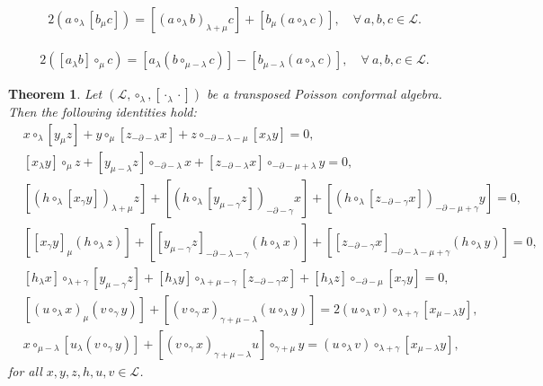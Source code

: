 \documentclass[10pt,a4paper]{amsart}
\newtheorem{theorem}{Theorem}
\begin{document}
   \begin{align}\label{rule3}
      2 (a\circ_{\lambda}[b_{\mu}c])=[(a\circ_{\lambda}b)_{\lambda+\mu}c]+[b_{\mu}(a\circ_{\lambda}c)],\quad\forall~ a,b,c\in \mathcal{L}.	
   \end{align}%

	\begin{align}\label{rule5}
		2([a_{\lambda}b]\circ_{\mu}c)=[a_{{\lambda}}(b\circ_{\mu-\lambda}c)]-[b_{\mu-\lambda}(a\circ_{\lambda}c)],\quad\forall~ a,b,c\in \mathcal{L}.
	\end{align}

\begin{theorem}
   Let $(\mathcal{L} ,\circ_\lambda,[{\cdot_ \lambda \cdot}])$ be a transposed Poisson conformal algebra. Then the following identities hold:
   \begin{align}
      &x\circ_{\lambda}[y_{\mu}z]+y\circ_{\mu}[z_{-\partial-\lambda}x]+z\circ_{-\partial-\lambda-\mu}[x_{\lambda}y]=0, \label{eqh}\\
      &[x_{\lambda}y]\circ_{\mu}z+[y_{\mu-\lambda}z]\circ_{-\partial-\lambda}x+[z_{-\partial-\lambda}x]\circ_{-\partial-\mu+\lambda}y=0, \label{eqw}\\
      &[(h\circ_{\lambda}[x_{\gamma}y])_{\lambda+\mu}z]+[(h\circ_{\lambda}[y_{\mu-\gamma}z])_{-\partial-\gamma}x]+[(h\circ_{\lambda}[z_{-\partial-\gamma}x])_{-\partial-\mu+\gamma}y]=0, \label{eqs}\\
      &[[x_{\gamma}y]_{\mu}(h\circ_{\lambda}z)]+[[y_{\mu-\gamma}z]_{-\partial-\lambda-\gamma}(h\circ_{\lambda}x)]+[[z_{-\partial-\gamma}x]_{-\partial-\lambda-\mu+\gamma}(h\circ_{\lambda}y)]=0, \label{equ}\\
      &[h_{\lambda}x]\circ_{\lambda+\gamma}[y_{\mu-\gamma}z]+[h_{\lambda}y]\circ_{\lambda+\mu-\gamma}[z_{-\partial-\gamma}x]+[h_{\lambda}z]\circ_{-\partial-\mu}[x_{\gamma}y]=0,  \label{eql}\\
      &[(u\circ_{\lambda}x)_{\mu}(v\circ_{\gamma}y)]+[(v\circ_{\gamma}x)_{\gamma+\mu-\lambda}(u\circ_{\lambda}y)]=2\left(u\circ_{\lambda}v\right)\circ_{\lambda+\gamma}[x_{\mu-\lambda}y], \label{ss1}\\
      &x\circ_{\mu-\lambda}[u_{\lambda}(v\circ_{\gamma}y)]+[(v\circ_{\gamma}x)_{\gamma+\mu-\lambda}u]\circ_{\gamma+\mu}y
      =\left(u\circ_{\lambda}v\right)\circ_{\lambda+\gamma}[x_{\mu-\lambda}y],\label{ss2}%
   \end{align}
   for all $x,y,z,h,u,v \in \mathcal{L}$.
\end{theorem}
\end{document}

